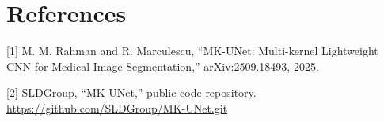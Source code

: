 \documentclass[10pt,a4paper]{article}
\begin{document}
\section*{References}
\footnotesize

[1] M. M. Rahman and R. Marculescu, ``MK-UNet: Multi-kernel Lightweight CNN for Medical Image Segmentation,'' arXiv:2509.18493, 2025.

[2] SLDGroup, ``MK-UNet,'' public code repository. \url{https://github.com/SLDGroup/MK-UNet.git}
\end{document}
